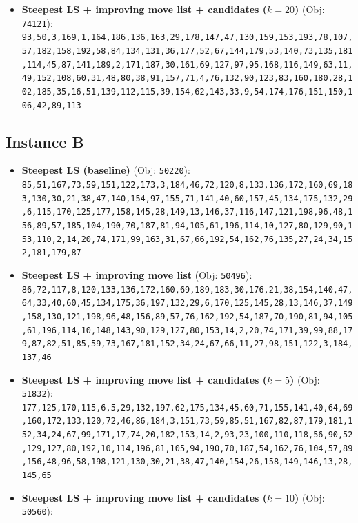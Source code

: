 \begin{itemize}[leftmargin=1.5em]
    \item \textbf{Steepest LS + improving move list + candidates ($k = 20$)} (Obj: \texttt{74121}):\\
    \texttt{93,50,3,169,1,164,186,136,163,29,178,147,47,130,159,153,193,78,107,57,182,158,192,58,84,134,131,36,177,52,67,144,179,53,140,73,135,181,114,45,87,141,189,2,171,187,30,161,69,127,97,95,168,116,149,63,11,49,152,108,60,31,48,80,38,91,157,71,4,76,132,90,123,83,160,180,28,102,185,35,16,51,139,112,115,39,154,62,143,33,9,54,174,176,151,150,106,42,89,113}
\end{itemize}

\subsection{Instance B}
\begin{itemize}[leftmargin=1.5em]
    \item \textbf{Steepest LS (baseline)} (Obj: \texttt{50220}):\\
    \texttt{85,51,167,73,59,151,122,173,3,184,46,72,120,8,133,136,172,160,69,183,130,30,21,38,47,140,154,97,155,71,141,40,60,157,45,134,175,132,29,6,115,170,125,177,158,145,28,149,13,146,37,116,147,121,198,96,48,156,89,57,185,104,190,70,187,81,94,105,61,196,114,10,127,80,129,90,153,110,2,14,20,74,171,99,163,31,67,66,192,54,162,76,135,27,24,34,152,181,179,87}
    \item \textbf{Steepest LS + improving move list} (Obj: \texttt{50496}):\\
    \texttt{86,72,117,8,120,133,136,172,160,69,189,183,30,176,21,38,154,140,47,64,33,40,60,45,134,175,36,197,132,29,6,170,125,145,28,13,146,37,149,158,130,121,198,96,48,156,89,57,76,162,192,54,187,70,190,81,94,105,61,196,114,10,148,143,90,129,127,80,153,14,2,20,74,171,39,99,88,179,87,82,51,85,59,73,167,181,152,34,24,67,66,11,27,98,151,122,3,184,137,46}
    \item \textbf{Steepest LS + improving move list + candidates ($k = 5$)} (Obj: \texttt{51832}):\\
    \texttt{177,125,170,115,6,5,29,132,197,62,175,134,45,60,71,155,141,40,64,69,160,172,133,120,72,46,86,184,3,151,73,59,85,51,167,82,87,179,181,152,34,24,67,99,171,17,74,20,182,153,14,2,93,23,100,110,118,56,90,52,129,127,80,192,10,114,196,81,105,94,190,70,187,54,162,76,104,57,89,156,48,96,58,198,121,130,30,21,38,47,140,154,26,158,149,146,13,28,145,65}
    \item \textbf{Steepest LS + improving move list + candidates ($k = 10$)} (Obj: \texttt{50560}):\\

\end{itemize}
